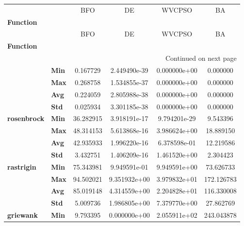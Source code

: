 \begin{longtable}{llcccc}
\toprule
            &     &          BFO &            DE &        WVCPSO &           BA \\
\textbf{Function} & {} &              &               &               &              \\
\midrule
\endfirsthead

\toprule
            &     &          BFO &            DE &        WVCPSO &           BA \\
\textbf{Function} & {} &              &               &               &              \\
\midrule
\endhead
\midrule
\multicolumn{6}{r}{{Continued on next page}} \\
\midrule
\endfoot

\bottomrule
\endlastfoot
\multirow{4}{*}{\textbf{sphere}} & \textbf{Min} &     0.167729 &  2.449490e-39 &  0.000000e+00 &     0.000000 \\
            & \textbf{Max} &     0.268758 &  1.534855e-37 &  0.000000e+00 &     0.000000 \\
            & \textbf{Avg} &     0.224059 &  2.805988e-38 &  0.000000e+00 &     0.000000 \\
            & \textbf{Std} &     0.025934 &  3.301185e-38 &  0.000000e+00 &     0.000000 \\
\cline{1-6}
\multirow{4}{*}{\textbf{rosenbrock}} & \textbf{Min} &    36.282915 &  3.918191e-17 &  9.794201e-29 &     9.543396 \\
            & \textbf{Max} &    48.314153 &  5.613868e-16 &  3.986624e+00 &    18.889150 \\
            & \textbf{Avg} &    42.935933 &  1.996220e-16 &  6.378598e-01 &    12.219586 \\
            & \textbf{Std} &     3.432751 &  1.406209e-16 &  1.461520e+00 &     2.304423 \\
\cline{1-6}
\multirow{4}{*}{\textbf{rastrigin}} & \textbf{Min} &    75.343981 &  9.949591e-01 &  9.949591e+00 &    73.626733 \\
            & \textbf{Max} &    94.502021 &  9.351932e+00 &  3.979832e+01 &   172.126783 \\
            & \textbf{Avg} &    85.019148 &  4.314559e+00 &  2.204828e+01 &   116.330008 \\
            & \textbf{Std} &     5.009736 &  1.986805e+00 &  7.379770e+00 &    27.862769 \\
\cline{1-6}
\multirow{4}{*}{\textbf{griewank}} & \textbf{Min} &     9.793395 &  0.000000e+00 &  2.055911e+02 &   243.043878 \\

\end{longtable}

